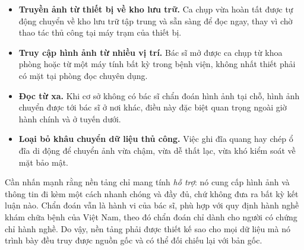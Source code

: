 \begin{itemize}
    \item \textbf{Truyền ảnh từ thiết bị về kho lưu trữ.} Ca chụp vừa hoàn tất
          được tự động chuyển về kho lưu trữ tập trung và sẵn sàng để đọc ngay,
          thay vì chờ thao tác thủ công tại máy trạm của thiết bị.
    \item \textbf{Truy cập hình ảnh từ nhiều vị trí.} Bác sĩ mở được ca chụp từ
          khoa phòng hoặc từ một máy tính bất kỳ trong bệnh viện, không nhất
          thiết phải có mặt tại phòng đọc chuyên dụng.
    \item \textbf{Đọc từ xa.} Khi cơ sở không có bác sĩ chẩn đoán hình ảnh tại
          chỗ, hình ảnh chuyển được tới bác sĩ ở nơi khác, điều này đặc biệt
          quan trọng ngoài giờ hành chính và ở tuyến dưới.
    \item \textbf{Loại bỏ khâu chuyển dữ liệu thủ công.} Việc ghi đĩa quang hay
          chép ổ đĩa di động để chuyển ảnh vừa chậm, vừa dễ thất lạc, vừa khó
          kiểm soát về mặt bảo mật.
\end{itemize}

Cần nhấn mạnh rằng nền tảng chỉ mang tính \emph{hỗ trợ}: nó cung cấp hình ảnh
và thông tin đi kèm một cách nhanh chóng và đầy đủ, chứ không đưa ra bất kỳ kết
luận nào. Chẩn đoán vẫn là hành vi của bác sĩ, phù hợp với quy định hành nghề
khám chữa bệnh của Việt Nam, theo đó chẩn đoán chỉ dành cho người có chứng chỉ
hành nghề. Do vậy, nền tảng phải được thiết kế sao cho mọi dữ liệu mà nó trình
bày đều truy được nguồn gốc và có thể đối chiếu lại với bản gốc.
